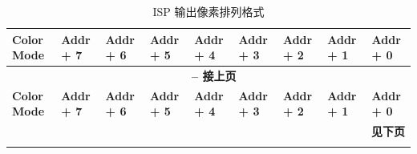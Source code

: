 \documentclass[main\_\_CN.tex]{subfiles}
\begin{document}
\scriptsize
\begin{longtable}[c]{ |p{2cm}|p{1.5cm}|p{1.5cm}|p{1.5cm}|p{1.5cm}|p{1.5cm}|p{1.5cm}|p{1.5cm}|p{1.5cm}| }
    \caption{ISP 输出像素排列格式}
    \label{tab:isp_output_color_space}\\\hline

    \rowcolor{lightgray}
    \textbf{Color Mode} & \textbf{Addr + 7} & \textbf{Addr + 6} & \textbf{Addr + 5} & \textbf{Addr + 4} & \textbf{Addr + 3} & \textbf{Addr + 2} & \textbf{Addr + 1} & \textbf{Addr + 0} \\\hline
    \endfirsthead


    \multicolumn{9}{c}{\bfseries \tablename\ \thetable{} -- 接上页}\\\hline
    \rowcolor{lightgray}
    \textbf{Color Mode} & \textbf{Addr + 7} & \textbf{Addr + 6} & \textbf{Addr + 5} & \textbf{Addr + 4} & \textbf{Addr + 3} & \textbf{Addr + 2} & \textbf{Addr + 1} & \textbf{Addr + 0} \\\hline
    \endhead

    \multicolumn{9}{r}{\textbf{见下页}} \\
    \endfoot


\end{longtable}
\end{document}
